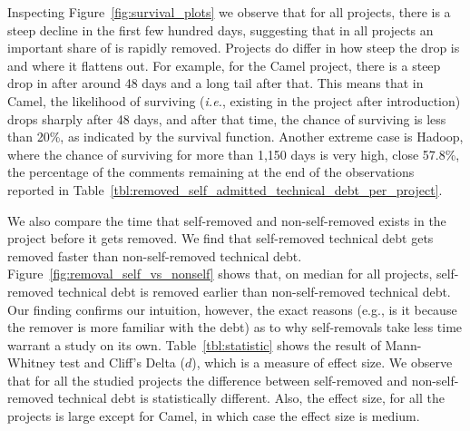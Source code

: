 Inspecting Figure~\ref{fig:survival_plots} we observe that for all projects, there is a steep decline in the first few hundred days, suggesting that in all projects an important share of \SATD is rapidly removed. Projects do differ in how steep the drop is and where it flattens out. For example, for the Camel project, there is a steep drop in \SATD after around 48 days and a long tail after that. This means that in Camel, the likelihood of \SATD surviving (\emph{i.e.}, existing in the project after introduction) drops sharply after 48 days, and after that time, the chance of surviving is less than 20\%, as indicated by the survival function. Another extreme case is Hadoop, where the chance of \SATD surviving for more than 1,150 days is very high, close 57.8\%, the percentage
of the \SATD comments remaining at the end of the observations reported in Table~\ref{tbl:removed_self_admitted_technical_debt_per_project}. 


We also compare the time that self-removed and non-self-removed \SATD exists in the project before it gets removed. We find that self-removed technical debt gets removed faster than non-self-removed technical debt. Figure~\ref{fig:removal_self_vs_nonself} shows that, on median for all projects, self-removed technical debt is removed earlier than non-self-removed technical debt. Our finding confirms our intuition, however, the exact reasons (e.g., is it because the remover is more familiar with the debt) as to why self-removals take less time warrant a study on its own. Table~\ref{tbl:statistic} shows the result of  Mann-Whitney test and Cliff's Delta ($d$), which is a measure of effect size. We observe that for all the studied projects the difference between self-removed and non-self-removed technical debt is statistically different. Also, the effect size, for all the projects is large except for Camel, in which case the effect size is medium.





